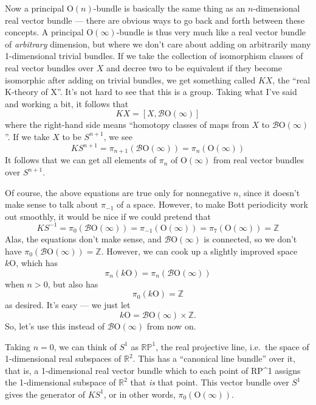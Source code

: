 \documentclass{article}
\begin{document}
Now a principal \(\mathrm{O}(n)\)-bundle is basically the same thing as
an \(n\)-dimensional real vector bundle --- there are obvious ways to go
back and forth between these concepts. A principal
\(\mathrm{O}(\infty)\)-bundle is thus very much like a real vector
bundle of \emph{arbitrary} dimension, but where we don't care about
adding on arbitrarily many 1-dimensional trivial bundles. If we take the
collection of isomorphism classes of real vector bundles over \(X\) and
decree two to be equivalent if they become isomorphic after adding on
trivial bundles, we get something called \(KX\), the ``real K-theory of
X''. It's not hard to see that this is a group. Taking what I've said
and working a bit, it follows that
\[KX = [X, \mathcal{B}\mathrm{O}(\infty)]\] where the right-hand side
means ``homotopy classes of maps from \(X\) to
\(\mathcal{B}\mathrm{O}(\infty)\)''. If we take \(X\) to be \(S^{n+1}\),
we see
\[KS^{n+1} = \pi_{n+1}(\mathcal{B}\mathrm{O}(\infty)) = \pi_n(\mathrm{O}(\infty))\]
It follows that we can get all elements of \(\pi_n\) of
\(\mathrm{O}(\infty)\) from real vector bundles over \(S^{n+1}\).

Of course, the above equations are true only for nonnegative \(n\),
since it doesn't make sense to talk about \(\pi_{-1}\) of a space.
However, to make Bott periodicity work out smoothly, it would be nice if
we could pretend that
\[KS^{-1} = \pi_0(\mathcal{B}\mathrm{O}(\infty)) = \pi_{-1}(\mathrm{O}(\infty)) = \pi_7(\mathrm{O}(\infty)) = \mathbb{Z}\]
Alas, the equations don't make sense, and
\(\mathcal{B}\mathrm{O}(\infty)\) is connected, so we don't have
\(\pi_0(\mathcal{B}\mathrm{O}(\infty)) = \mathbb{Z}\). However, we can
cook up a slightly improved space \(k\mathrm{O}\), which has
\[\pi_n(k\mathrm{O}) = \pi_n(\mathcal{B}\mathrm{O}(\infty))\] when
\(n > 0\), but also has \[\pi_0(k\mathrm{O}) = \mathbb{Z}\] as desired.
It's easy --- we just let
\[k\mathrm{O} = \mathcal{B}\mathrm{O}(\infty)\times\mathbb{Z}.\] So,
let's use this instead of \(\mathcal{B}\mathrm{O}(\infty)\) from now on.

Taking \(n = 0\), we can think of \(S^1\) as \(\mathbb{RP}^1\), the real
projective line, i.e.~the space of 1-dimensional real subspaces of
\(\mathbb{R}^2\). This has a ``canonical line bundle'' over it, that is,
a 1-dimensional real vector bundle which to each point of RP\^{}1
assigns the 1-dimensional subspace of \(\mathbb{R}^2\) that \emph{is}
that point. This vector bundle over \(S^1\) gives the generator of
\(KS^1\), or in other words, \(\pi_0(\mathrm{O}(\infty))\).
\end{document}
